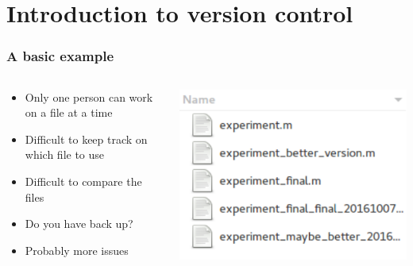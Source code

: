 \section[Introduction]{Introduction to version control}
\begin{frame}
	\frametitle{A basic example}
	\begin{columns}
		\begin{column}{0.5\textwidth}
		\begin{itemize}[<+->]
			\item Only one person can work on a file at a time
			\item Difficult to keep track on which file to use
			\item Difficult to compare the files
			\item Do you have back up?
			\item Probably more issues
		\end{itemize}
		\end{column}
		\begin{column}{0.5\textwidth}
			\begin{center}
				\includegraphics[width=\textwidth]{./pictures/simple.pdf}
			\end{center}
		\end{column}
	\end{columns}
\end{frame}

